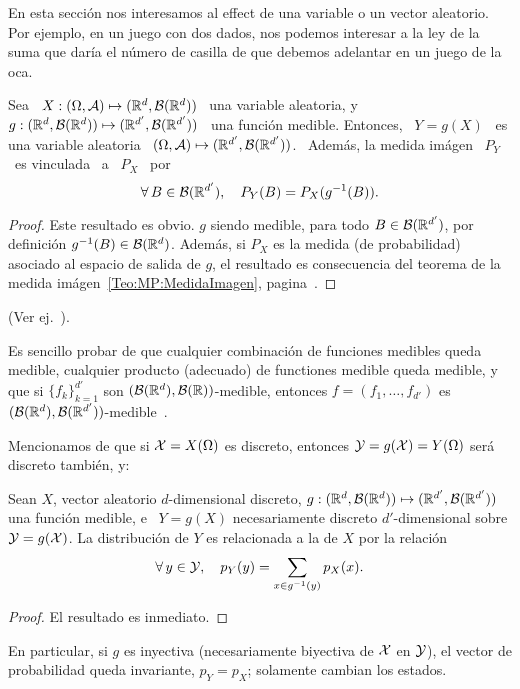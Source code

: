 \label{Sec:MP:Transformacion}

En  esta  secci\'on nos  interesamos  al  effect de  una  variable  o un  vector
aleatorio. Por  ejemplo, en un juego con  dos dados, nos podemos  interesar a la
ley de la suma que dar\'ia el n\'umero de casilla de que debemos adelantar en un
juego de la oca.
%
\begin{teorema}
\label{Teo:MP:TransformacionMedible}
%
  Sea  \  $X:  (\Omega,\mathcal{A})  \mapsto  (\mathbb{R}^d ,  \mathcal{B}(\mathbb{R}^d))$  \  una  variable
  aleatoria,   y  \   $g:  (\mathbb{R}^d   ,  \mathcal{B}(\mathbb{R}^d))   \mapsto   (\mathbb{R}^{d'}  ,
  \mathcal{B}(\mathbb{R}^{d'}))$ \  una funci\'on  medible. Entonces,  \ $Y =  g(X)$ \  es una
  variable aleatoria  \ $(\Omega,\mathcal{A})  \mapsto (\mathbb{R}^{d'} ,  \mathcal{B}(\mathbb{R}^{d'}))$. \
  Adem\'as, la medida im\'agen \ $P_Y$ \ es vinculada \ a \ $P_X$ \ por
  \[
  \forall \, B \in \mathcal{B}(\mathbb{R}^{d'}), \quad P_Y(B) = P_X(g^{-1}(B)).
  \]
\end{teorema}
%
\begin{proof}
  Este resultado es obvio. $g$ siendo medible, para todo $B \in \mathcal{B}(\mathbb{R}^{d'})$,
  por definici\'on $g^{-1}(B) \in \mathcal{B}(\mathbb{R}^d)$.  Adem\'as, si $P_X$ es la medida
  (de  probabilidad) asociado  al  espacio de  salida  de $g$,  el resultado  es
  consecuencia  del  teorema  de la  medida  im\'agen~\ref{Teo:MP:MedidaImagen},
  pagina~\pageref{Teo:MP:MedidaImagen}.
\end{proof}
%
\noindent (Ver ej.~\cite{Muk00, JacPro03, AthLah06, Bog07:v2, Coh13}).


Es sencillo  probar de que  cualquier combinaci\'on de funciones  medibles queda
medible, cualquier  producto (adecuado) de  functiones medible queda  medible, y
que si $\{ f_k \}_{k=1}^{d'}$ son $(\mathcal{B}(\mathbb{R}^d),\mathcal{B}(\mathbb{R}))$-medible, entonces $f
=          (f_1         ,          \ldots         ,          f_{d'})$         es
$(\mathcal{B}(\mathbb{R}^d),\mathcal{B}(\mathbb{R}^{d'}))$-medible~\cite{AthLah06}.



Mencionamos  de que si  $\mathcal{X} =  X(\Omega)$ es  discreto, entonces  $\mathcal{Y} =  g(\mathcal{X}) =
Y(\Omega)$ ser\'a discreto tambi\'en, y:
%
\begin{teorema}
\label{Teo:MP:TransformacionMasa}
%
  Sean   $X$,   vector  aleatorio   $d$-dimensional   discreto,  $g:(\mathbb{R}^d   ,
  \mathcal{B}(\mathbb{R}^d)) \mapsto (\mathbb{R}^{d'} , \mathcal{B}(\mathbb{R}^{d'}))$ una funci\'on medible, e \
  $Y =  g(X)$ necesariamente discreto  $d'$-dimensional sobre $\mathcal{Y} =  g(\mathcal{X})$.  La
  distribuci\'on de $Y$ es relacionada a la de $X$ por la relaci\'on
  \[
  \forall \, y \in \mathcal{Y}, \quad p_Y(y) = \sum_{x \in g^{-1}(y)} p_X(x).
  \]
\end{teorema}
%
\begin{proof}
  El resultado es inmediato.
\end{proof}
%
\noindent En particular,  si $g$ es inyectiva (necesariamente  biyectiva de $\mathcal{X}$
en $\mathcal{Y}$),  el vector  de probabilidad queda  invariante, $p_Y =  p_X$; solamente
cambian los estados.

